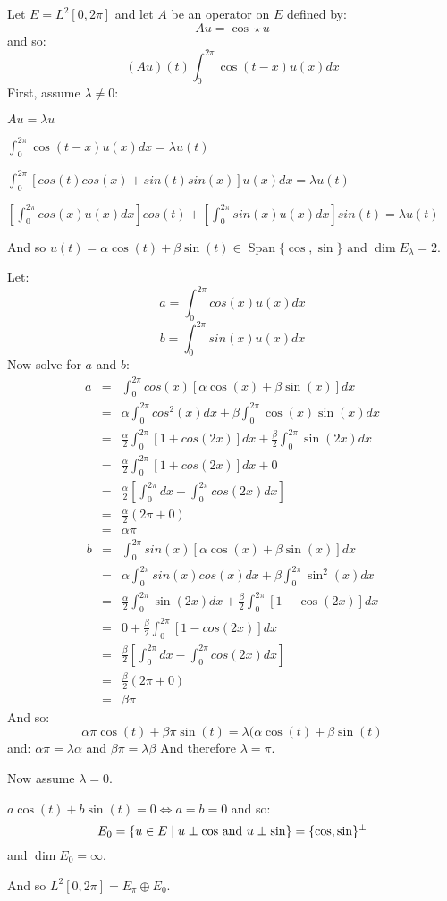 \documentclass[letterpaper,12pt,fleqn]{article}
\renewcommand{\l}{\lambda}
\renewcommand{\a}{\alpha}
\renewcommand{\b}{\beta}
\DeclareMathOperator{\spn}{Span}
\begin{document}
\begin{example}
  Let $E=L^2[0,2\pi]$ and let $A$ be an operator on $E$ defined by:
  \[Au=\cos\star u\]
  and so:
  \[(Au)(t)\int_0^{2\pi}\cos(t-x)u(x)dx\]
  First, assume $\l\ne0$:

  $Au=\l u$
  
  $\int_0^{2\pi}\cos(t-x)u(x)dx=\l u(t)$

  $\int_0^{2\pi}[cos(t)cos(x)+sin(t)sin(x)]u(x)dx=\l u(t)$
  
  $\left[\int_0^{2\pi}cos(x)u(x)dx\right]cos(t)+
  \left[\int_0^{2\pi}sin(x)u(x)dx\right]sin(t)=\l u(t)$
  
  And so $u(t)=\a\cos(t)+\b\sin(t)\in\spn\{\cos,\sin\}$ and $\dim E_{\l}=2$.
  
  Let:
  \[a=\int_0^{2\pi}cos(x)u(x)dx\]
  \[b=\int_0^{2\pi}sin(x)u(x)dx\]
  Now solve for $a$ and $b$:
  \begin{eqnarray*}
    a &=& \int_0^{2\pi}cos(x)[\a\cos(x)+\b\sin(x)]dx \\
    &=& \a\int_0^{2\pi}cos^2(x)dx+\b\int_0^{2\pi}\cos(x)\sin(x)dx \\
    &=& \frac{\a}{2}\int_0^{2\pi}[1+cos(2x)]dx+
    \frac{\b}{2}\int_0^{2\pi}\sin(2x)dx \\
    &=& \frac{\a}{2}\int_0^{2\pi}[1+cos(2x)]dx+0 \\
    &=& \frac{\a}{2}\left[\int_0^{2\pi}dx+\int_0^{2\pi}cos(2x)dx\right] \\
    &=& \frac{\a}{2}(2\pi+0) \\
    &=& \a\pi
  \end{eqnarray*}
  \begin{eqnarray*}
    b &=& \int_0^{2\pi}sin(x)[\a\cos(x)+\b\sin(x)]dx \\
    &=& \a\int_0^{2\pi}sin(x)cos(x)dx+\b\int_0^{2\pi}\sin^2(x)dx \\
    &=& \frac{\a}{2}\int_0^{2\pi}\sin(2x)dx+
    \frac{\b}{2}\int_0^{2\pi}[1-\cos(2x)]dx \\
    &=& 0+\frac{\b}{2}\int_0^{2\pi}[1-cos(2x)]dx \\
    &=& \frac{\b}{2}\left[\int_0^{2\pi}dx-\int_0^{2\pi}cos(2x)dx\right] \\
    &=& \frac{\b}{2}(2\pi+0) \\
    &=& \b\pi
  \end{eqnarray*}
  And so:
  \[\a\pi\cos(t)+\b\pi\sin(t)=\l(\a\cos(t)+\b\sin(t)\]
  and:
  $\a\pi=\l\a$ and $\b\pi=\l\b$
  And therefore $\l=\pi$.

  Now assume $\l=0$.

  $a\cos(t)+b\sin(t)=0\iff a=b=0$ and so:
  \[E_0=\{u\in E\mid u\perp\cos$ and $u\perp\sin\}=\{\cos,\sin\}^{\perp}\]
  and $\dim E_0=\infty$.

  And so $L^2[0,2\pi]=E_{\pi}\oplus E_0$.
\end{example}
\end{document}

